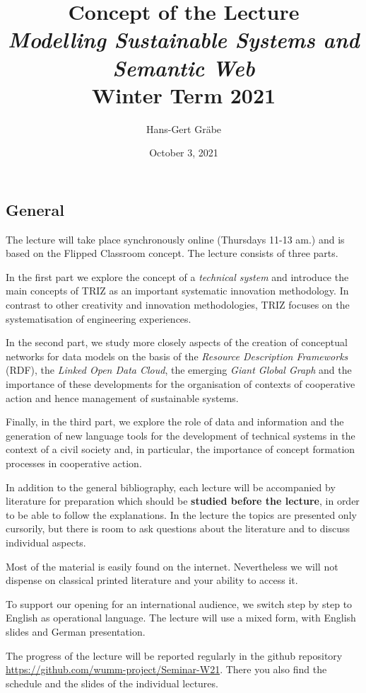 \documentclass[11pt,a4paper]{article}
\title{Concept of the Lecture \\[1em] \emph{Modelling Sustainable Systems and
    Semantic Web} \\[1em] Winter Term 2021}
\author{Hans-Gert Gr\"abe}
\date{October 3, 2021}
\begin{document}
\maketitle

\subsection{General}

The lecture will take place synchronously online (Thursdays 11-13 am.) and is
based on the Flipped Classroom concept. The lecture consists of three parts.

In the first part we explore the concept of a \emph{technical system} and
introduce the main concepts of TRIZ as an important systematic innovation
methodology.  In contrast to other creativity and innovation methodologies,
TRIZ focuses on the systematisation of engineering experiences.

In the second part, we study more closely aspects of the creation of
conceptual networks for data models on the basis of the \emph{Resource
  Description Frameworks} (RDF), the \emph{Linked Open Data Cloud}, the
emerging \emph{Giant Global Graph} and the importance of these developments
for the organisation of contexts of cooperative action and hence management of
sustainable systems.

Finally, in the third part, we explore the role of data and information and
the generation of new language tools for the development of technical systems
in the context of a civil society and, in particular, the importance of
concept formation processes in cooperative action.

In addition to the general bibliography, each lecture will be accompanied by
literature for preparation which should be \textbf{studied before the
  lecture}, in order to be able to follow the explanations. In the lecture the
topics are presented only cursorily, but there is room to ask questions about
the literature and to discuss individual aspects.

Most of the material is easily found on the internet. Nevertheless we will not
dispense on classical printed literature and your ability to access it.

To support our opening for an international audience, we switch step by step
to English as operational language. The lecture will use a mixed form, with
English slides and German presentation.

The progress of the lecture will be reported regularly in the github
repository \url{https://github.com/wumm-project/Seminar-W21}. There you also
find the schedule and the slides of the individual lectures.
\end{document}
